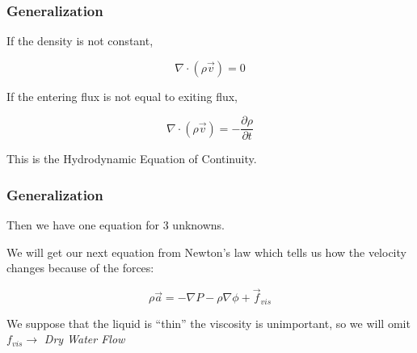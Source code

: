 \documentclass[]{beamer}
\begin{document}
\begin{frame}

\frametitle{Generalization}

If the density is not constant, 


 \begin{equation*}
\nabla \cdot (\rho \vec{v})=0
\end{equation*}

If the entering flux is not equal to exiting flux,

 \begin{equation*}
\nabla \cdot (\rho \vec{v})=-\frac{\partial \rho}{\partial t}
\end{equation*}

This is the Hydrodynamic Equation of Continuity.
 \end{frame}








\begin{frame}

\frametitle{Generalization}
Then we have one equation for 3 unknowns.

\pause

\vspace{3mm}

 We will get our next equation from Newton’s law which tells us how the
velocity changes because of the forces:


 \begin{equation*}
\rho \vec{a}=-\nabla P-\rho \nabla \phi +\vec{f}_{vis}
\end{equation*}

\pause

\vspace{3mm}
We  suppose that the liquid is “thin” the viscosity is unimportant, so we will omit $f_{vis}\rightarrow$ \textit{Dry Water Flow} 

 \end{frame}



\end{document}
